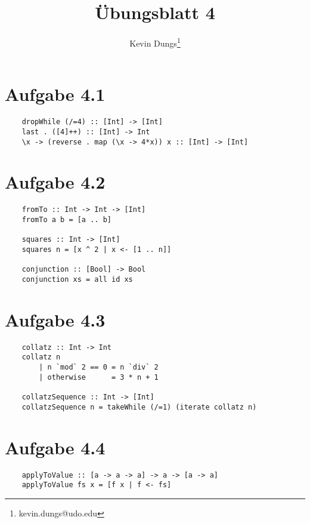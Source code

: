 \documentclass[a4paper]{scrartcl}
\title{Übungsblatt 4}
\author{Kevin Dungs\thanks{kevin.dungs@udo.edu}}
\begin{document}
\maketitle

\section*{Aufgabe 4.1}
\begin{verbatim}
    dropWhile (/=4) :: [Int] -> [Int]
    last . ([4]++) :: [Int] -> Int
    \x -> (reverse . map (\x -> 4*x)) x :: [Int] -> [Int]
\end{verbatim}

\section*{Aufgabe 4.2}
\begin{verbatim}
    fromTo :: Int -> Int -> [Int]
    fromTo a b = [a .. b]

    squares :: Int -> [Int]
    squares n = [x ^ 2 | x <- [1 .. n]]

    conjunction :: [Bool] -> Bool
    conjunction xs = all id xs
\end{verbatim}

\section*{Aufgabe 4.3}
\begin{verbatim}
    collatz :: Int -> Int
    collatz n
        | n `mod` 2 == 0 = n `div` 2
        | otherwise      = 3 * n + 1

    collatzSequence :: Int -> [Int]
    collatzSequence n = takeWhile (/=1) (iterate collatz n)
\end{verbatim}

\section*{Aufgabe 4.4}
\begin{verbatim}
    applyToValue :: [a -> a -> a] -> a -> [a -> a]
    applyToValue fs x = [f x | f <- fs]
\end{verbatim}
\end{document}
